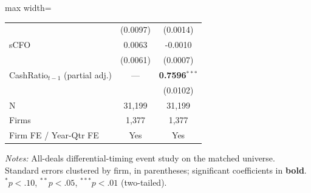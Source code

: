 \begin{table}[htbp]
\begin{adjustbox}{max width=\linewidth}
\begin{tabular}{lcc}
 & (0.0097) & (0.0014)  \\
sCFO & 0.0063 & -0.0010  \\
 & (0.0061) & (0.0007)  \\
CashRatio$_{t-1}$ (partial adj.) & --- & \textbf{0.7596}$^{***}$  \\
 &  & (0.0102)  \\
\midrule
N & 31,199 & 31,199  \\
Firms & 1,377 & 1,377  \\
\midrule
Firm FE / Year-Qtr FE & Yes & Yes \\
\bottomrule\end{tabular}\end{adjustbox}
\begin{minipage}{\linewidth}\vspace{2pt}\scriptsize\textit{Notes:} All-deals differential-timing event study on the matched universe. Standard errors clustered by firm, in parentheses; significant coefficients in \textbf{bold}. $^{*}p<.10$, $^{**}p<.05$, $^{***}p<.01$ (two-tailed).\end{minipage}\end{table}

\clearpage

